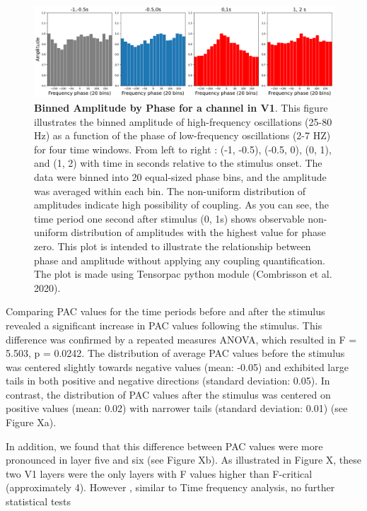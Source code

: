 \documentclass[
  letterpaper,
  DIV=11,
  numbers=noendperiod]{scrartcl}
\begin{document}
\begin{figure}[H]

{\centering \includegraphics{images/bin_amplitude.png}

}

\caption{\textbf{Binned Amplitude by Phase for a channel in V1}. This
figure illustrates the binned amplitude of high-frequency oscillations
(25-80 Hz) as a function of the phase of low-frequency oscillations (2-7
HZ) for four time windows. From left to right : (-1, -0.5), (-0.5, 0),
(0, 1), and (1, 2) with time in seconds relative to the stimulus onset.
The data were binned into 20 equal-sized phase bins, and the amplitude
was averaged within each bin. The non-uniform distribution of amplitudes
indicate high possibility of coupling. As you can see, the time period
one second after stimulus (0, 1s) shows observable non-uniform
distribution of amplitudes with the highest value for phase zero. This
plot is intended to illustrate the relationship between phase and
amplitude without applying any coupling quantification. The plot is made
using Tensorpac python module (Combrisson et al. 2020).}

\end{figure}%

Comparing PAC values for the time periods before and after the stimulus
revealed a significant increase in PAC values following the stimulus.
This difference was confirmed by a repeated measures ANOVA, which
resulted in F = 5.503, p = 0.0242. The distribution of average PAC
values before the stimulus was centered slightly towards negative values
(mean: -0.05) and exhibited large tails in both positive and negative
directions (standard deviation: 0.05). In contrast, the distribution of
PAC values after the stimulus was centered on positive values (mean:
0.02) with narrower tails (standard deviation: 0.01) (see Figure Xa).

In addition, we found that this difference between PAC values were more
pronounced in layer five and six (see Figure Xb). As illustrated in
Figure X, these two V1 layers were the only layers with F values higher
than F-critical (approximately 4). However , similar to Time frequency
analysis, no further statistical tests
\end{document}
